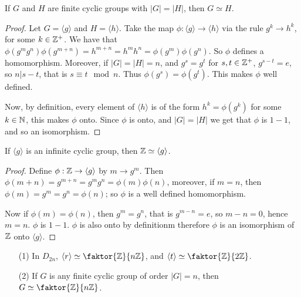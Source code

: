 \begin{theorem}\label{proposition_2.3.5}
  If $G$ and  $H$ are finite cyclic groups with  $|G|=|H|$, then $G
  \simeq H$.
\end{theorem}
\begin{proof}
  Let $G=\langle g \rangle$ and $H=\langle h \rangle$. Take the map
  $\phi:\langle g \rangle \rightarrow \langle h \rangle$ via the rule
  $g^k \rightarrow h^k$, for some $k \in \mathbb{Z}^+$. We have that
  $\phi(g^mg^n)\phi(g^{m+n})=h^{m+n}=h^mh^n=\phi(g^m)\phi(g^n)$. So $\phi$
  defines a homomorphism. Moreover, if $|G|=|H|=n$, and $g^s=g^t$ for
  $s,t \in \mathbb{Z}^+$,  $g^{s-t}=e$, so $n|s-t$, that is  $s \equiv t \mod{n}$.
  Thus $\phi(g^s)=\phi(g^t)$. This makes $\phi$ well defined.

  Now, by definition, every element of  $\langle h \rangle$ is of the form
  $h^k=\phi(g^k)$ for some $k \in \mathbb{N}$, this makes  $\phi$ onto. Since  $\phi$
  is onto, and  $|G|=|H|$ we get that $\phi$ is  $1-1$, and so an
  isomorphism.
\end{proof}
\begin{corollary}
  If $\langle g \rangle$ is an infinite cyclic group, then $\mathbb{Z} \simeq
  \langle g \rangle$.
\end{corollary}
\begin{proof}
  Define $\phi:\mathbb{Z} \rightarrow \langle g \rangle$ by $m \rightarrow g^m$. Then
  $\phi(m+n)=g^{m+n}=g^mg^n=\phi(m)\phi(n)$, moreover, if $m=n$, then
  $\phi(m)=g^m=g^n=\phi(n)$; so $\phi$ is a well defined homomorphism.

  Now if  $\phi(m)=\phi(n)$, then $g^m=g^n$, that is  $g^{m-n}=e$, so $m-n=0$,
  hence  $m=n$.  $\phi$ is  $1-1$.  $\phi$ is also onto by definitionm
  therefore  $\phi$ is an isomorphism of  $\mathbb{Z}$ onto $\langle g \rangle$.
\end{proof}

\begin{example}
  \begin{enumerate}
    \item[(1)] In $D_{2n}$, $\langle r \rangle \simeq
      \faktor{\Z}{n\Z}$, and $\langle t \rangle \simeq
      \faktor{\Z}{2\Z}$.

    \item[(2)] If $G$ is any finite cyclic group of order $|G|=n$,
      then $G \simeq \faktor{\Z}{n\Z}$.
  \end{enumerate}
\end{example}

